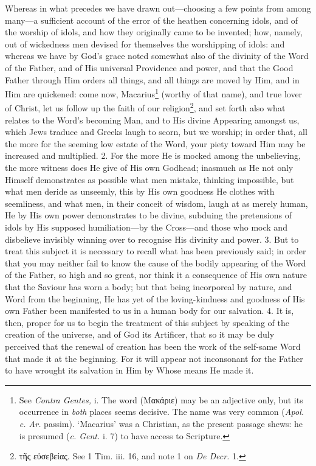 Whereas in what precedes we have drawn out—choosing a few points from among many—a sufficient account of the error of the heathen concerning idols, and of the worship of idols, and how they originally came to be invented; how, namely, out of wickedness men devised for themselves the worshipping of idols: and whereas we have by God’s grace noted somewhat also of the divinity of the Word of the Father, and of His universal Providence and power, and that the Good Father through Him orders all things, and all things are moved by Him, and in Him are quickened: come now, Macarius\footnote{See \emph{Contra Gentes,} i. The word (Μ\textgreek{ακάριε}) may be an adjective only, but its occurrence in \emph{both} places seems decisive. The name was very common (\emph{Apol. c. Ar.} passim). ‘Macarius’ was a Christian, as the present passage shews: he is presumed (\emph{c. Gent.} i. 7) to have access to Scripture.} (worthy of that name), and true lover of Christ, let us follow up the faith of our religion\footnote{\textgreek{τῆς εὐσεβείας}. See 1 Tim. iii. 16, and note 1 on \emph{De Decr.} 1.}, and set forth also what relates to the Word’s becoming Man, and to His divine Appearing amongst us, which Jews traduce and Greeks laugh to scorn, but we worship; in order that, all the more for the seeming low estate of the Word, your piety toward Him may be increased and multiplied. 2. For the more He is mocked among the unbelieving, the more witness does He give of His own Godhead; inasmuch as He not only Himself demonstrates as possible what men mistake, thinking impossible, but what men deride as unseemly, this by His own goodness He clothes with seemliness, and what men, in their conceit of wisdom, laugh at as merely human, He by His own power demonstrates to be divine, subduing the pretensions of idols by His supposed humiliation—by the Cross—and those who mock and disbelieve invisibly winning over to recognise His divinity and power. 3. But to treat this subject it is necessary to recall what has been previously said; in order that you may neither fail to know the cause of the bodily appearing of the Word of the Father, so high and so great, nor think it a consequence of His own nature that the Saviour has worn a body; but that being incorporeal by nature, and Word from the beginning, He has yet of the loving-kindness and goodness of His own Father been manifested to us in a human body for our salvation. 4. It is, then, proper for us to begin the treatment of this subject by speaking of the creation of the universe, and of God its Artificer, that so it may be duly perceived that the renewal of creation has been the work of the self-same Word that made it at the beginning. For it will appear not inconsonant for the Father to have wrought its salvation in Him by Whose means He made it.

